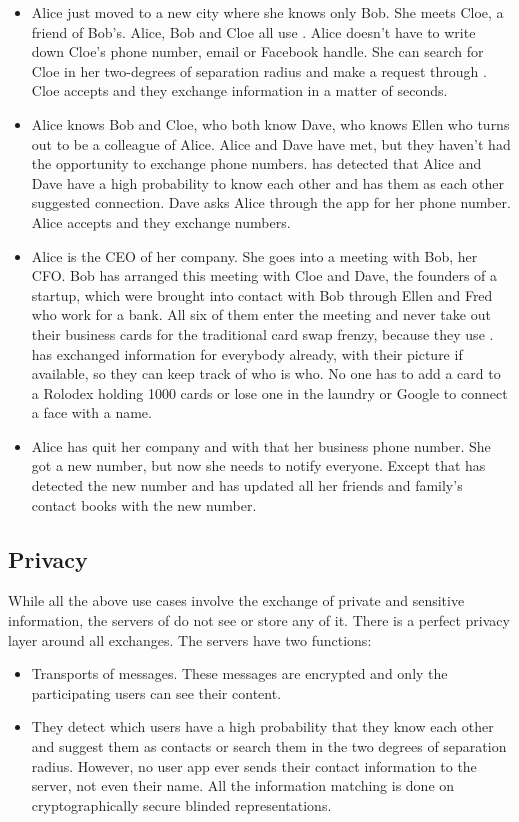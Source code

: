 \documentclass[a4paper, twoside, 10pt]{article}
\begin{document}
\begin{itemize}
  \item Alice just moved to a new city where she knows only Bob. She meets Cloe, a friend of Bob's. Alice, Bob and Cloe all use \commercialName{}. Alice doesn't have to write 
down Cloe's phone number, email or Facebook handle. She can search for Cloe in her two-degrees of separation radius and make a request through \commercialName{}. Cloe accepts and 
they exchange information in a matter of seconds.
  \item Alice knows Bob and Cloe, who both know Dave, who knows Ellen who turns out to be a colleague of Alice. Alice and Dave have met, but they haven't had the opportunity to 
exchange phone numbers. \commercialName{} has detected that Alice and Dave have a high probability to know each other and has them as each other suggested connection. Dave asks 
Alice through the app for her phone number. Alice accepts and they exchange numbers.
  \item Alice is the CEO of her company. She goes into a meeting with Bob, her CFO. Bob has arranged this meeting with Cloe and Dave, the founders of a startup, which were brought 
into contact with Bob through Ellen and Fred who work for a bank. All six of them enter the meeting and never take out their business cards for the traditional card swap frenzy, 
because they use \commercialName{}. \commercialName{} has exchanged information for everybody already, with their picture if available, so they can keep track of who is who. No 
one has to add a card to a Rolodex holding 1000 cards or lose one in the laundry or Google to connect a face with a name.
  \item Alice has quit her company and with that her business phone number. She got a new number, but now she needs to notify everyone. Except that \commercialName{} has detected 
the new number and has updated all her friends and family's contact books with the new number.
\end{itemize}

\subsection{Privacy}

While all the above use cases involve the exchange of private and sensitive information, the servers of \commercialName{} do not see or store any of it. There is a perfect privacy 
layer around all exchanges. The servers have two functions:

\begin{itemize}
 \item Transports of messages. These messages are encrypted and only the participating users can see their content.
 \item They detect which users have a high probability that they know each other and suggest them as contacts or search them in the two degrees of separation radius. However, no 
user app ever sends their contact information to the server, not even their name. All the information matching is done on cryptographically secure blinded representations.
\end{itemize}
\end{document}
